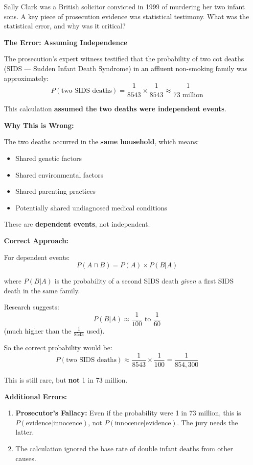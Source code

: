 \documentclass[11pt,a4paper]{article}
\begin{document}
\begin{question}
Sally Clark was a British solicitor convicted in 1999 of murdering her two infant sons. A key piece of prosecution evidence was statistical testimony. What was the statistical error, and why was it critical?
\end{question}

\begin{answer}
\textbf{The Error: Assuming Independence}

The prosecution's expert witness testified that the probability of two cot deaths (SIDS — Sudden Infant Death Syndrome) in an affluent non-smoking family was approximately:
\[
P(\text{two SIDS deaths}) = \frac{1}{8543} \times \frac{1}{8543} \approx \frac{1}{73 \text{ million}}
\]

This calculation \textbf{assumed the two deaths were independent events}.

\vspace{0.3cm}
\textbf{Why This is Wrong:}

The two deaths occurred in the \textbf{same household}, which means:
\begin{itemize}
    \item Shared genetic factors
    \item Shared environmental factors
    \item Shared parenting practices
    \item Potentially shared undiagnosed medical conditions
\end{itemize}

These are \textbf{dependent events}, not independent.

\vspace{0.3cm}
\textbf{Correct Approach:}

For dependent events:
\[
P(A \cap B) = P(A) \times P(B|A)
\]

where $P(B|A)$ is the probability of a second SIDS death \textit{given} a first SIDS death in the same family.

Research suggests:
\[
P(B|A) \approx \frac{1}{100} \text{ to } \frac{1}{60}
\]
(much higher than the $\frac{1}{8543}$ used).

So the correct probability would be:
\[
P(\text{two SIDS deaths}) \approx \frac{1}{8543} \times \frac{1}{100} = \frac{1}{854,300}
\]

This is still rare, but \textbf{not} 1 in 73 million.

\vspace{0.3cm}
\textbf{Additional Errors:}
\begin{enumerate}
    \item \textbf{Prosecutor's Fallacy:} Even if the probability were 1 in 73 million, this is $P(\text{evidence}|\text{innocence})$, not $P(\text{innocence}|\text{evidence})$. The jury needs the latter.
    \item The calculation ignored the base rate of double infant deaths from other causes.
\end{enumerate}


\end{answer}
\end{document}
